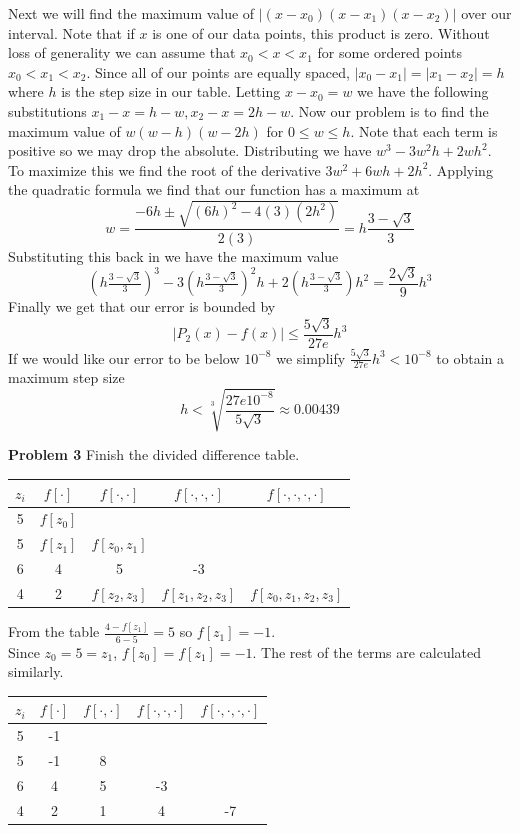\documentclass[12pt]{article}
\newcommand{\problem}[1]{\hspace{-4 ex} \large \textbf{Problem #1} }
\begin{document}
	Next we will find the maximum value of $\vert (x-x_0)(x-x_1)(x-x_2) \vert$ over our interval. Note that if $x$ is one of our data points, this product is zero. Without loss of generality we can assume that $x_0 < x < x_1$ for some ordered points $x_0 < x_1 < x_2$. Since all of our points are equally spaced, $\vert x_0 - x_1 \vert = \vert x_1 - x_2 \vert = h$ where $h$ is the step size in our table. Letting $ x-x_0 = w$ we have the following substitutions $ x_1-x = h-w, x_2 - x = 2h - w$. Now our problem is to find the maximum value of $ w(w-h)(w-2h)$ for $ 0 \leq w \leq h$. Note that each term is positive so we may drop the absolute. Distributing we have $w^3 - 3w^2h + 2wh^2$. To maximize this we find the root of the derivative $3w^2 + 6wh + 2h^2$. Applying the quadratic formula we find that our function has a maximum at 
	$$
	w = \frac{-6h \pm \sqrt{(6h)^2 - 4(3)(2h^2)}}{2(3)} = h \frac{3-\sqrt{3}}{3}
	$$
	Substituting this back in we have the maximum value
	$$
	(h \tfrac{3-\sqrt{3}}{3})^3 - 3(h \tfrac{3-\sqrt{3}}{3})^2h + 2(h \tfrac{3-\sqrt{3}}{3})h^2 = \frac{2 \sqrt{3}}{9}h^3
	$$
	Finally we get that our error is bounded by
	$$
	\vert P_2(x) - f(x) \vert \leq \frac{5\sqrt{3}}{27e}h^3
	$$
	If we would like our error to be below $10^{-8}$ we simplify $\frac{5\sqrt{3}}{27e}h^3 < 10^{-8}$ to obtain a maximum step size
	$$
	h < \sqrt[3]{\frac{27e10^{-8}}{5 \sqrt{3}}} \approx 0.00439
	$$
	
\problem{3} Finish the divided difference table.

	\begin{center}
		\begin{tabular}{|c|c|c|c|c|}\hline
			$z_i$ & $f[\cdot]$ & $f[\cdot,\cdot]$ & $f[\cdot,\cdot,\cdot]$ & $f[\cdot,\cdot,\cdot,\cdot]$ \\ \hline
			5 & $f[z_0]$ & & & \\ \hline
			5 & $f[z_1]$ & $f[z_0,z_1]$ & & \\ \hline
			6 & 4 & 5 & -3 & \\ \hline
			4 & 2 & $f[z_2,z_3]$ & $f[z_1,z_2,z_3]$ & $f[z_0,z_1,z_2,z_3]$ \\ \hline
		\end{tabular}
	\end{center}
	From the table $\frac{4-f[z_1]}{6-5} = 5$ so $f[z_1]=-1$. \\
	Since $z_0=5=z_1$, $f[z_0] = f[z_1] = -1$.
	The rest of the terms are calculated similarly.
	\begin{center}
		\begin{tabular}{|c|c|c|c|c|}\hline
			$z_i$ & $f[\cdot]$ & $f[\cdot,\cdot]$ & $f[\cdot,\cdot,\cdot]$ & $f[\cdot,\cdot,\cdot,\cdot]$ \\ \hline
			5 & -1 & & & \\ \hline
			5 & -1 & 8 & & \\ \hline
			6 & 4 & 5 & -3 & \\ \hline
			4 & 2 & 1 & 4 & -7 \\ \hline
		\end{tabular}
	\end{center}
\end{document}
